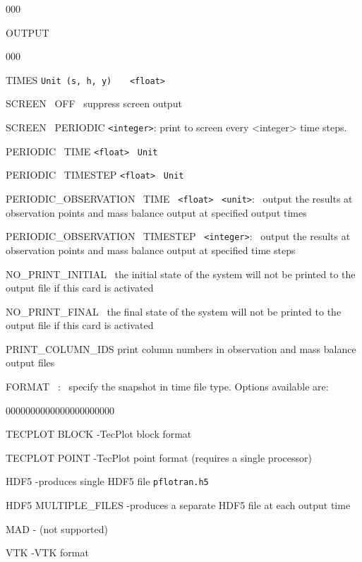 \documentclass[12pt]{article}
\begin{document}

\begin{deflist}{000}
\item[OUTPUT] ~
\begin{deflist}{000}
\item[TIMES] {\tt Unit (s, h, y)} \ \ \ {\tt <float>} 
\item[SCREEN \ OFF] \ suppress screen output
\item[SCREEN \ PERIODIC] {\tt <integer>}: print to screen every <integer> time steps.
\item[PERIODIC \ TIME] {\tt <float>} \ {\tt Unit}
\item[PERIODIC \ TIMESTEP] {\tt <float>} \ {\tt Unit}
\item[PERIODIC\_OBSERVATION \ TIME] \ {\tt <float>} \ {\tt <unit>}: \ output the results at observation points and mass balance output at specified output times
\item[PERIODIC\_OBSERVATION \ TIMESTEP] \ {\tt <integer>}: \ output the results at observation points and mass balance output at specified time steps 
\item[NO\_PRINT\_INITIAL] \ the initial state of the system will not be printed to the output file if this card is activated
\item[NO\_PRINT\_FINAL] \ the final state of the system will not be printed to the output file if this card is activated
\item[PRINT\_COLUMN\_IDS] print column numbers in observation and mass balance output files
\item[FORMAT] \ <file format>: \ specify the snapshot in time file type. Options available are: 
\begin{deflist}{0000000000000000000000}
\item[TECPLOT BLOCK] -TecPlot block format
\item[TECPLOT POINT] -TecPlot point format (requires a single processor)
\item[HDF5] -produces single HDF5 file {\tt pflotran.h5}
\item[HDF5 MULTIPLE\_FILES] -produces a separate HDF5 file at each output time
\item[MAD] - (not supported)
\item[VTK] -VTK format
\end{deflist}

\end{deflist}
\end{deflist}
\end{document}
